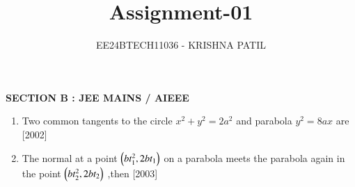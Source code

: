 \documentclass[journal,12pt,twocolumn]{IEEEtran}
\theoremstyle{remark}
\begin{document}

\vspace{3cm}

\title{Assignment-01}
\author{EE24BTECH11036 - KRISHNA PATIL}
\maketitle
\newpage
\bigskip

\renewcommand{\thefigure}{\theenumi}
\renewcommand{\thetable}{\theenumi}

\textbf{SECTION B : JEE MAINS / AIEEE}
\hfill

\begin{enumerate}

\item Two common tangents to the circle {$ x^2+y^2=2a^2 $} and parabola {$ y^2 = 8ax $} are \hfill{[2002]}


\begin{enumerate}[label=(\alph*)]
\end{enumerate}

\hfill

\item The normal at a point {$ \left(bt_1^2 ,2bt_1\right) $} on a parabola meets the parabola again in the point {$ \left(bt_2^2 ,2bt _2\right) $}  ,then \hfill {[2003]}


\begin{enumerate}[label=(\alph*)]
\end{enumerate}

\hfill


\end{enumerate}
\end{document}
